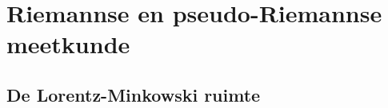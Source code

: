 \documentclass[main.tex]{subfiles}
\begin{document}
\chapter{Riemannse en pseudo-Riemannse meetkunde}
\label{cha:rieman}

\section{De Lorentz-Minkowski ruimte}
\label{sec:de-lorentz-minkowski}
\end{document}
